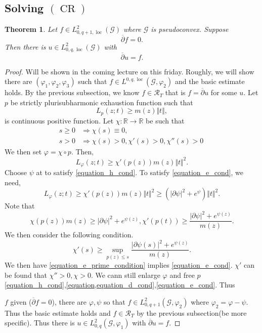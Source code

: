 \documentclass{article}
\newtheorem{theorem}{Theorem} [section]
\DeclareMathOperator{\CR}{CR}
\DeclareMathOperator{\loc}{loc}
\newcommand{\norm}[1]{\Vert #1 \Vert}
\newcommand{\R}[0]{\mathbb{R}}
\newcommand{\G}[0]{\mathcal{G}}
\begin{document}
\subsection{Solving $(\CR)$}
\begin{theorem}
  Let $f\in L^2_{0,q+1,\loc}(\G)$ where $\G$ is pseudoconvex. Suppose 
  \begin{equation*}
  \overline{\partial}f=0.
  \end{equation*}
  Then there is $u\in L^2_{0,q,\loc}(\G)$ with 
  \begin{equation*}
    \overline{\partial}u = f.
  \end{equation*}
\end{theorem}
\begin{proof}
  Will be shown in the coming lecture on this friday. Roughly, we will show there are $(\varphi_1,\varphi_2,\varphi_3)$ such that $f\in L^{0,q,\loc}(\G,\varphi_2)$ and the basic estimate holds. By the previous subsection, we know $f\in\mathcal{R}_T$ that is $f=\overline{\partial}u$ for some $u$.
  Let $p$ be strictly plurisubharmonic exhaustion function such that 
  \begin{equation*}
    L_p(z;t)\geq m(z)\norm{t},
  \end{equation*}
  is continuous positive function. Let $\chi:\R\to\R$ be such that 
  \begin{align*}
    s\geq0&\Rightarrow\chi(s)\equiv 0,\\
    s>0&\Rightarrow\chi(s)>0,\chi'(s)>0,\chi''(s)>0\
  \end{align*}
  We then set $\varphi=\chi\circ p$. Then,
  \begin{equation*}
    L_\varphi(z;t)\geq \chi'(p(z))m(z)\norm{t}^2.
  \end{equation*}
  Choose $\psi$ at to satisfy \eqref{equation_h_cond}. To satisfy \eqref{equation_e_cond}, we need,
  \begin{equation*}
  L_\varphi(z;t)\geq \chi'(p(z))m(z)\norm{t}^2\geq(\vert\partial\psi\vert^2+e^\psi)\norm{t}^2.
  \end{equation*}
  Note that
  \begin{equation*}
    \chi(p(z))m(z)\geq\vert\partial \psi\vert^2+e^{\psi(z)},\chi'(p(t))\geq{\frac {\vert\partial \psi\vert^2+e^{\psi(z)}}{m(z)}}.
  \end{equation*}
  We then consider the following condition.
  \begin{equation*}
    \chi'(s)\geq\sup_{p(z)\leq s}{\frac {\vert \partial \psi(s)\vert^2+e^{\psi(z)}}{m(z)}}. \tag{$E'$}\label{equation_e_prime_condition}
  \end{equation*}
  We then have \eqref{equation_e_prime_condition} implies \eqref{equation_e_cond}. $\chi'$ can be  found that $\chi''>0,\chi>0$.
  We cann still enlarge $\varphi$ and free $p$ \eqref{equation_h_cond},\eqref{equation,equation_d_cond},\eqref{equation_e_cond}. Thus 
  \par $f$ given ($\overline{\partial}f=0$), there are $\varphi,\psi$ so that $f\in L_{0,q+1}^2(\G,\varphi_2)$ where $\varphi_2=\varphi-\psi$. 
  Thus the basic estimate holds and $f\in\mathcal{R}_T$ by the previous subsection(be more specific). Thus there is $u\in L_{0,q}^2(\G,\varphi_1)$ with $\overline{\partial}u=f$.
\end{proof}
\end{document}
